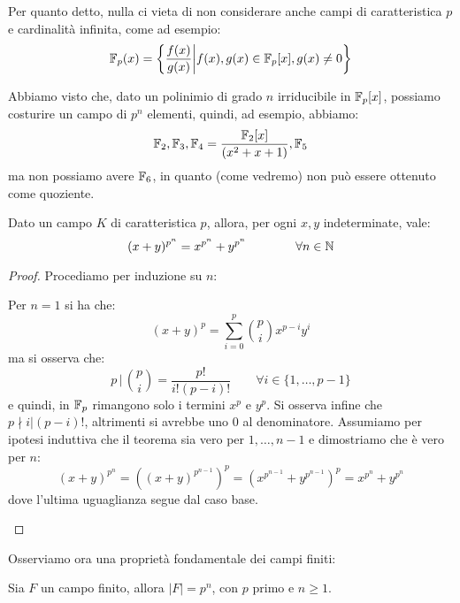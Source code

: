 \documentclass[11pt]{scrartcl}
\begin{document}
\begin{example}
Per quanto detto, nulla ci vieta di non considerare anche campi di caratteristica $p$ e
cardinalità infinita, come ad esempio:
	\[ {\mathbb F}_p(x) = \left\{\frac{f(x)}{g(x)} \middle| f(x),g(x) \in {\mathbb F}_p[x], g(x) \ne 0\right\}
		\]

\end{example}

\begin{remark}
	Abbiamo visto che, dato un polinimio di grado $n$ irriducibile in ${\mathbb F}_p[x]$, possiamo costurire un campo di $p^n$
	elementi, quindi, ad esempio, abbiamo:
		\[\mathbb{F}_{2},\mathbb{F}_{3},\mathbb{F}_{4}=\frac{\mathbb{F}_{2}[x]}{(x^2+x+1)},\mathbb{F}_{5}
			\]
		ma non possiamo avere $\mathbb{F}_{6}$, in quanto (come vedremo) non può essere ottenuto come quoziente.
\end{remark}

\newpage
\begin{lemma}
\label{cf:bin}
Dato un campo $K$ di caratteristica $p$, allora, per ogni $x,y$ indeterminate,
vale:
	\[ (x+y)^{p^n} = x^{p^n} + y^{p^n}
	\qquad
	\qquad \forall n \in \mathbb N
		\]
\end{lemma}

\begin{proof}
	Procediamo per induzione su $n$:
		\begin{itemize}
			\ii Per $n = 1$ si ha che:
				\[ (x+y)^p = \sum_{i=0}^{p}\binom{p}{i}x^{p-i}y^i
					\]
			ma si osserva che:
				\[ p \, \Big| \, \binom{p}{i} = \frac{p!}{i!(p-i)!}
				\qquad \forall i \in \{1,\ldots,p-1\}
					\]
				e quindi, in ${\mathbb F}_p$ rimangono solo i termini $x^p$ e $y^p$. Si osserva infine che $p \nmid i|(p-i)!$, altrimenti si 
				avrebbe uno $0$ al denominatore.
			\ii Assumiamo per ipotesi induttiva che il teorema sia vero per
			$1,\ldots,n-1$ e dimostriamo che è vero per $n$:
				\[ (x+y)^{p^n} = \left((x+y)^{p^{n-1}}\right)^{p} = \left(x^{p^{n-1}} + y^{p^{n-1}}\right)^p = x^{p^n} + y^{p^n}
					\]
			dove l'ultima uguaglianza segue dal caso base.
		\end{itemize} 
\end{proof}

Osserviamo ora una proprietà fondamentale dei campi finiti:

\begin{proposition}
	Sia $F$ un campo finito, allora $|F| = p^n$, con $p$ primo e $n \geq 1$.
\end{proposition}
\end{document}
